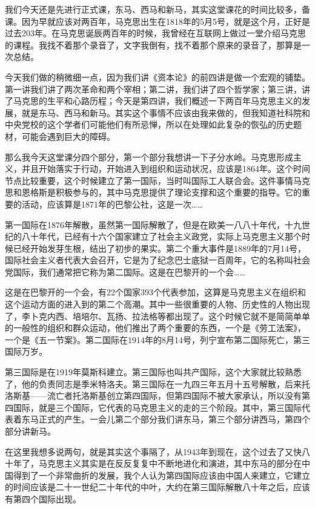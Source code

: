 \documentclass[UTF8, 12pt, a4paper]{ctexrep}
\begin{document}
我们今天还是先进行正式课，东马、西马和新马，其实这堂课花的时间比较多，备课。因为早就应该对两百年，马克思出生在1818年的5月5号，就是这个月，正好是过去203年。在马克思诞辰两百年的时候，我曾经在互联网上做过一堂介绍马克思的课程。我找不着那个录音了，文字我倒有，找不着那个原来的录音了，那算是一次总结。

今天我们做的稍微细一点，因为我们讲《资本论》的前四讲是做一个宏观的铺垫。第一讲我们讲了两次革命和两个宰相；第二讲，我们讲了四个哲学家；第三讲，讲了马克思的生平和心路历程；今天是第四讲，我们概述一下两百年马克思主义的发展，就是东马、西马和新马。其实这个事情不应该由我来做的，但我知道社科院和中央党校的这个学者们可能他们有所忌惮，所以在处理如此复杂的恢弘的历史题材，可能会遇到巨大的障碍。

那么我今天这堂课分四个部分，第一个部分我想讲一下子分水岭。马克思形成主义，并且开始落实于行动，开始进入到组织和运动状况，应该是1864年。这个时间节点比较重要，这个时候建立了第一国际，当时叫国际工人联合会。这件事情马克思和恩格斯是积极参与的，其中马克思提供了理论支撑和这个重要的指导。它的重要的活动，应该算是1871年的巴黎公社，这是一次……

第一国际在1876年解散，虽然第一国际解散了，但是在欧美一八八十年代，十九世纪的八十年代，已经有十六个国家建立了社会主义政党，实际上马克思主义那个时候已经开始发芽生根，结出了初步的果实。第二个重大事件是1889年的7月14号，国际社会主义者代表大会召开，它是为了纪念巴士底狱一百周年，它的名称叫社会党国际，我们通常把它称为第二国际。这是在巴黎开的一个会……

这是在巴黎开的一个会，有22个国家393个代表参加，这算是马克思主义在组织和这个运动方面的进入到的第二个高潮。其中一些很重要的人物、历史性的人物出现了，李卜克内西、培培尔、瓦扬、拉法格等都出现了。这个时候它就不是简简单单的一般性的组织和群众运动，他们推出了两个重要的东西，一个是《劳工法案》，一个是《五一节案》。第二国际在1914年的8月14号，列宁宣布第二国际死亡，第三国际万岁。

第三国际是在1919年莫斯科建立。第三国际也叫共产国际，这个大家就比较熟悉了，他的负责同志是季米特洛夫。第三国际在一九四三年五月十五号解散，后来托洛斯基——流亡者托洛斯基创立第四国际，但第四国际不被大家承认，所以没有第四国际，就是三个国际，它代表的马克思主义的走的三个阶段。其中，第三国际代表着东马正式的产生。一会儿第二个部分我们讲东马，第三个部分讲西马，第四个部分讲新马。

在这里我想多说两句，就是其实这个事隔了，从1943年到现在，这个过去了又快八十年了，马克思主义其实是在反反复复中不断地进化和演进，其中东马的部分在中国得到了一个非常曲折的发展，我个人认为第四国际应该由中国人来建立，它建立的时间应该是二十一世纪二十年代的中叶，大约在第三国际解散八十年之后，应该有第四个国际出现。
\end{document}
